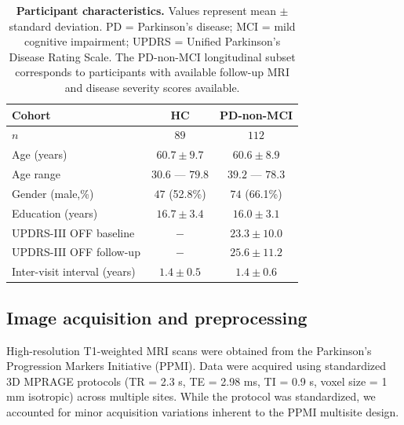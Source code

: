 \begin{table}[h!]
    \centering
    \begin{tabular}{lcc}
        \toprule
        \textbf{Cohort}              & \textbf{HC}       & \textbf{PD-non-MCI}
        \\
        \hline %
        $n$                          & $89$              & $112$
        \\
        Age (years)                  & $60.7 \pm 9.7$    & $60.6 \pm 8.9$
        \\
        Age range                    & $30.6$ --- $79.8$ & $39.2$ --- $78.3$
        \\
        Gender (male,\%)             & $47$ (52.8\%)     & $74$ (66.1\%)
        \\
        Education (years)            & $16.7 \pm 3.4$    & $16.0 \pm 3.1$
        \\
        UPDRS-III OFF baseline       & $-$               & $23.3 \pm 10.0$
        \\
        UPDRS-III OFF follow-up      & $-$               & $25.6 \pm 11.2$
        \\
        Inter-visit interval (years) & $1.4 \pm 0.5$     & $1.4 \pm 0.6$
        \\
        \bottomrule
    \end{tabular}
    \vspace{1em}
    \caption{\textbf{Participant characteristics.} Values represent mean $\pm$
        standard deviation. PD = Parkinson's disease; MCI = mild cognitive
        impairment; UPDRS = Unified Parkinson's Disease Rating Scale. The
        PD-non-MCI longitudinal subset corresponds to participants with
        available follow-up MRI and disease severity scores
        available.\label{tab:cohort_stat}}
\end{table}

\subsection{Image acquisition and preprocessing}

High-resolution T1-weighted MRI scans were obtained from the Parkinson's
Progression Markers Initiative (PPMI). Data were acquired using standardized 3D
MPRAGE protocols (TR = 2.3 s, TE = 2.98 ms, TI = 0.9 s, voxel size = 1 mm
isotropic) across multiple sites. While the protocol was standardized, we
accounted for minor acquisition variations inherent to the PPMI multisite
design.

